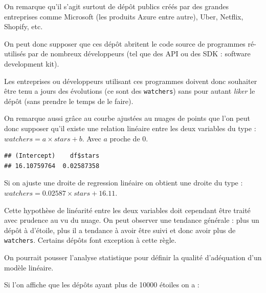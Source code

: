 \documentclass[
]{article}
\newenvironment{Shaded}{\begin{snugshade}}{\end{snugshade}}
\newcommand{\FunctionTok}[1]{\textcolor[rgb]{0.13,0.29,0.53}{\textbf{#1}}}
\newcommand{\NormalTok}[1]{#1}
\newcommand{\SpecialCharTok}[1]{\textcolor[rgb]{0.81,0.36,0.00}{\textbf{#1}}}
\begin{document}
On remarque qu'il s'agit surtout de dépôt publics créés par des grandes
entreprises comme Microsoft (les produits Azure entre autre), Uber,
Netflix, Shopify, etc.

On peut donc supposer que ces dépôt abritent le code source de
programmes ré-utilisés par de nombreux développeurs (tel que des API ou
des SDK : software development kit).

Les entreprises ou développeurs utilisant ces programmes doivent donc
souhaiter être tenu a jours des évolutions (ce sont des
\texttt{watchers}) sans pour autant \emph{liker} le dépôt (sans prendre
le temps de le faire).

On remarque aussi grâce au courbe ajustées au nuages de points que l'on
peut donc supposer qu'il existe une relation linéaire entre les deux
variables du type : \(watchers = a \times stars + b\). Avec \(a\) proche
de 0.

\begin{Shaded}
\end{Shaded}

\begin{verbatim}
## (Intercept)    df$stars 
## 16.10759764  0.02587358
\end{verbatim}

Si on ajuste une droite de regression linéaire on obtient une droite du
type : \(watchers = 0.02587 \times stars + 16.11\).

Cette hypothèse de linéarité entre les deux variables doit cependant
être traité avec prudence au vu du nuage. On peut observer une tendance
générale : plus un dépôt à d'étoile, plus il a tendance à avoir être
suivi et donc avoir plus de \texttt{watchers}. Certains dépôts font
exception à cette règle.

On pourrait pousser l'analyse statistique pour définir la qualité
d'adéquation d'un modèle linéaire.

Si l'on affiche que les dépôts ayant plus de 10000 étoiles on a :
\end{document}

